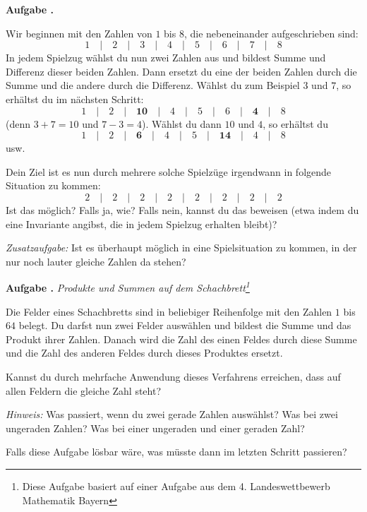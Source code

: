 \documentclass[a4paper,ngerman,12pt]{scrartcl}
\theoremstyle{definition}
\theoremstyle{plain}
\theoremstyle{remark}
\newlength{\aufgabenskip}
\newcounter{aufgabennummer}
\newenvironment{aufgabe}[1]{
	\addtocounter{aufgabennummer}{1}
	\textbf{Aufgabe \theaufgabennummer.} \emph{#1} \par
}{\vspace{\aufgabenskip}}
\begin{document}
\begin{aufgabe}{}
	
	Wir beginnen mit den Zahlen von $1$ bis $8$, die nebeneinander aufgeschrieben sind:
		\[1 \quad\vert\quad 2 \quad\vert\quad 3 \quad\vert\quad 4 \quad\vert\quad 5 \quad\vert\quad 6 \quad\vert\quad 7 \quad\vert\quad 8\]
	In jedem Spielzug wählst du nun zwei Zahlen aus und bildest Summe und Differenz dieser beiden Zahlen. Dann ersetzt du eine der beiden Zahlen durch die Summe und die andere durch die Differenz. Wählst du zum Beispiel $3$ und $7$, so erhältst du im nächsten Schritt:
		\[1 \quad\vert\quad 2 \quad\vert\quad \mathbf{10} \quad\vert\quad 4 \quad\vert\quad 5 \quad\vert\quad 6 \quad\vert\quad \mathbf{4} \quad\vert\quad 8\]
	(denn $3+7=10$ und $7-3=4$). Wählst du dann $10$ und $4$, so erhältst du
		\[1 \quad\vert\quad 2 \quad\vert\quad \mathbf{6} \quad\vert\quad 4 \quad\vert\quad 5 \quad\vert\quad \mathbf{14} \quad\vert\quad 4 \quad\vert\quad 8\]
	usw.
	
	Dein Ziel ist es nun durch mehrere solche Spielzüge irgendwann in folgende Situation zu kommen:
		\[2 \quad\vert\quad 2 \quad\vert\quad 2 \quad\vert\quad 2 \quad\vert\quad 2 \quad\vert\quad 2 \quad\vert\quad 2 \quad\vert\quad 2\]		
	Ist das möglich? Falls ja, wie? Falls nein, kannst du das beweisen (etwa indem du eine Invariante angibst, die in jedem Spielzug erhalten bleibt)?
	
	\emph{Zusatzaufgabe:} Ist es überhaupt möglich in eine Spielsituation zu kommen, in der nur noch lauter gleiche Zahlen da stehen?
\end{aufgabe}

\begin{aufgabe}{Produkte und Summen auf dem Schachbrett\footnote{Diese Aufgabe basiert auf einer Aufgabe aus dem 4. Landeswettbewerb Mathematik Bayern}}
	Die Felder eines Schachbretts sind in beliebiger Reihenfolge mit den Zahlen $1$ bis $64$ belegt. Du darfst nun zwei Felder auswählen und bildest die Summe und das Produkt ihrer Zahlen. Danach wird die Zahl des einen Feldes durch diese Summe und die Zahl des anderen Feldes durch dieses Produktes ersetzt. 
	
	Kannst du durch mehrfache Anwendung dieses Verfahrens erreichen, dass auf allen Feldern die gleiche Zahl steht?
	
	\emph{Hinweis:} Was passiert, wenn du zwei gerade Zahlen auswählst? Was bei zwei ungeraden Zahlen? Was bei einer ungeraden und einer geraden Zahl?
	
	Falls diese Aufgabe lösbar wäre, was müsste dann im letzten Schritt passieren?
\end{aufgabe}
\end{document}
